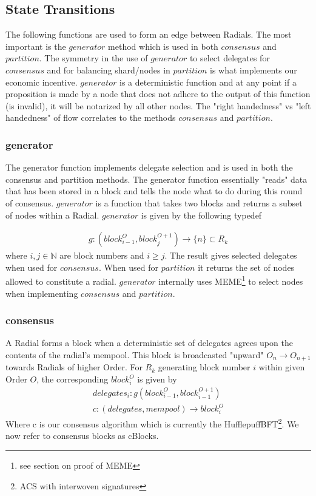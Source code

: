 \documentclass{article}
\begin{document}
\subsection{State Transitions}
The following functions are used to form an edge between Radials. The most important is the $generator$ method which is used in both $consensus$ and $partition$. The symmetry in the use of $generator$ to select delegates for $consensus$ and for balancing shard/nodes in $partition$ is what implements our economic incentive. $generator$ is a deterministic function and at any point if a proposition is made by a node that does not adhere to the output of this function (is invalid), it will be notarized by all other nodes. The "right handedness" vs "left handedness" of flow correlates to the methods $consensus$ and $partition$.

\subsubsection{generator}
The generator function implements delegate selection and is used in both the consensus and partition methods. The generator function essentially "reads" data that has been stored in a block and tells the node what to do during this round of consensus. $generator$ is a function that takes two blocks and returns a subset of nodes within a Radial. $generator$ is given by the following typedef

\begin{align*}
g: (block^{O}_{i-1}, block^{O+1}_{j}) \rightarrow \{ n\} \subset R_k
\end{align*}
where $i, j \in \mathbb{N}$ are block numbers and $i\geq j$. The result gives selected delegates when used for $consensus$. When used for $partition$ it returns the set of nodes allowed to constitute a radial. $generator$ internally uses MEME\footnote{see section on proof of MEME} to select nodes when implementing $consensus$ and $partition$.

\subsubsection{consensus}
A Radial forms a block when a deterministic set of delegates agrees upon the contents of the radial's mempool. This block is broadcasted "upward" $O_n \rightarrow O_{n+1}$ towards Radials of higher Order. For $R_k$ generating block number $i$ within given Order $O$, the corresponding $block^{O}_i$ is given by
\begin{align*}
delegates_i: g(block^{O}_{i-1}, block^{O+1}_{i-1}) \\
c: (delegates, mempool) \rightarrow block^{O}_i
\end{align*}
Where c is our consensus algorithm which is currently the HufflepuffBFT\footnote{ACS with interwoven signatures}. We now refer to consensus blocks as cBlocks.
\end{document}

